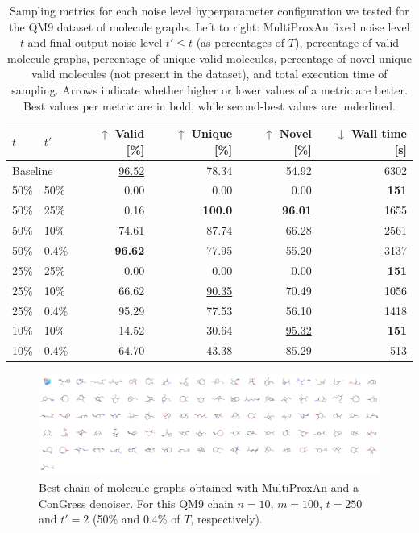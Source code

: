 \begin{table}[H]
    \centering
    \caption[MultiProxAn sampling metrics for the QM9 dataset of molecule graphs.]{Sampling metrics for each noise level hyperparameter configuration we tested for the QM9 dataset of molecule graphs. Left to right: MultiProxAn fixed noise level $t$ and final output noise level $t' \leq t$ (as percentages of $T$), percentage of valid molecule graphs, percentage of unique valid molecules, percentage of novel unique valid molecules (not present in the dataset), and total execution time of sampling. Arrows indicate whether higher or lower values of a metric are better. Best values per metric are in bold, while second-best values are underlined.}
    \begin{tabular}{llrrrr}
        \toprule
         $t$ & $t'$ & $\uparrow$ Valid [\%] & $\uparrow$ Unique [\%] & $\uparrow$ Novel [\%] & $\downarrow$ Wall time [s]  \\
         \midrule
         \multicolumn{2}{l}{Baseline} & \underline{96.52} & 78.34 & 54.92 & 6302 \\
         50\% & 50\% & 0.00 & 0.00 & 0.00 & \textbf{151} \\
         50\% & 25\% & 0.16 & \textbf{100.0} & \textbf{96.01} & 1655 \\
         50\% & 10\% & 74.61 & 87.74 & 66.28 & 2561 \\
         50\% & 0.4\% & \textbf{96.62} & 77.95 & 55.20 & 3137 \\
         25\% & 25\% & 0.00 & 0.00 & 0.00 & \textbf{151} \\
         25\% & 10\% & 66.62 & \underline{90.35} & 70.49 & 1056 \\
         25\% & 0.4\% & 95.29 & 77.53 & 56.10 & 1418 \\
         10\% & 10\% & 14.52 & 30.64 & \underline{95.32} & \textbf{151} \\
         10\% & 0.4\% & 64.70 & 43.38 & 85.29 & \underline{513} \\
         \bottomrule
    \end{tabular}
    \label{tab:qm9_stats}
\end{table}

\begin{figure}[H]
    \centering
    \includegraphics[width=\linewidth]{figures/multiprox/qm9_grid_image.png}
    \caption[Best chain of molecule graphs obtained with MultiProxAn and a ConGress denoiser.]{Best chain of molecule graphs obtained with MultiProxAn and a ConGress denoiser. For this QM9 chain $n=10$, $m=100$, $t=250$ and $t'=2$ (50\% and 0.4\% of $T$, respectively).
    }
    \label{fig:qm9_better}
\end{figure}

